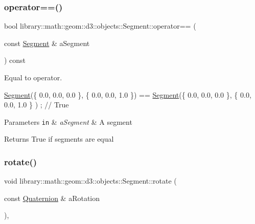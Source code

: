 \subsubsection{\texorpdfstring{operator==()}{operator==()}}
{\footnotesize\ttfamily bool library\+::math\+::geom\+::d3\+::objects\+::\+Segment\+::operator== (\begin{DoxyParamCaption}\item[{const \hyperlink{classlibrary_1_1math_1_1geom_1_1d3_1_1objects_1_1_segment}{Segment} \&}]{a\+Segment }\end{DoxyParamCaption}) const}



Equal to operator. 


\begin{DoxyCode}
\hyperlink{classlibrary_1_1math_1_1geom_1_1d3_1_1objects_1_1_segment_a5562342d1edf2f52e37ce1bc138ee7d7}{Segment}(\{ 0.0, 0.0, 0.0 \}, \{ 0.0, 0.0, 1.0 \}) == \hyperlink{classlibrary_1_1math_1_1geom_1_1d3_1_1objects_1_1_segment_a5562342d1edf2f52e37ce1bc138ee7d7}{Segment}(\{ 0.0, 0.0, 0.0 \}, \{ 0.0, 0.0, 1.0 \}
      ) ; \textcolor{comment}{// True}
\end{DoxyCode}



\begin{DoxyParams}[1]{Parameters}
\mbox{\tt in}  & {\em a\+Segment} & A segment \\
\hline
\end{DoxyParams}
\begin{DoxyReturn}{Returns}
True if segments are equal 
\end{DoxyReturn}
\mbox{\label{classlibrary_1_1math_1_1geom_1_1d3_1_1objects_1_1_segment_a9d1693e80bd013a09334b9b7233abc2f}} 
\subsubsection{\texorpdfstring{rotate()}{rotate()}}
{\footnotesize\ttfamily void library\+::math\+::geom\+::d3\+::objects\+::\+Segment\+::rotate (\begin{DoxyParamCaption}\item[{const \hyperlink{classlibrary_1_1math_1_1geom_1_1trf_1_1rot_1_1_quaternion}{Quaternion} \&}]{a\+Rotation }\end{DoxyParamCaption})\hspace{0.3cm}{\ttfamily [override]}, {\ttfamily [virtual]}}



